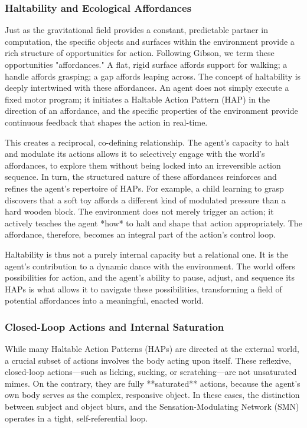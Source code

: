 \subsubsection*{Haltability and Ecological Affordances}
Just as the gravitational field provides a constant, predictable partner in computation, the specific objects and surfaces within the environment provide a rich structure of opportunities for action. Following Gibson, we term these opportunities "affordances." A flat, rigid surface affords support for walking; a handle affords grasping; a gap affords leaping across. The concept of haltability is deeply intertwined with these affordances. An agent does not simply execute a fixed motor program; it initiates a Haltable Action Pattern (HAP) in the direction of an affordance, and the specific properties of the environment provide continuous feedback that shapes the action in real-time.

This creates a reciprocal, co-defining relationship. The agent’s capacity to halt and modulate its actions allows it to selectively engage with the world’s affordances, to explore them without being locked into an irreversible action sequence. In turn, the structured nature of these affordances reinforces and refines the agent’s repertoire of HAPs. For example, a child learning to grasp discovers that a soft toy affords a different kind of modulated pressure than a hard wooden block. The environment does not merely trigger an action; it actively teaches the agent *how* to halt and shape that action appropriately. The affordance, therefore, becomes an integral part of the action's control loop.

Haltability is thus not a purely internal capacity but a relational one. It is the agent's contribution to a dynamic dance with the environment. The world offers possibilities for action, and the agent's ability to pause, adjust, and sequence its HAPs is what allows it to navigate these possibilities, transforming a field of potential affordances into a meaningful, enacted world.

\subsubsection*{Closed-Loop Actions and Internal Saturation}
While many Haltable Action Patterns (HAPs) are directed at the external world, a crucial subset of actions involves the body acting upon itself. These reflexive, closed-loop actions—such as licking, sucking, or scratching—are not unsaturated mimes. On the contrary, they are fully **saturated** actions, because the agent's own body serves as the complex, responsive object. In these cases, the distinction between subject and object blurs, and the Sensation-Modulating Network (SMN) operates in a tight, self-referential loop.

